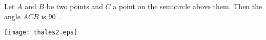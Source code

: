 \documentclass[12pt]{article}
\begin{document}
Let $A$ and $B$ be two points and $C$ a point on the semicircle above them. Then the angle $ACB$ is $90^\circ$.
\begin{center}
\texttt{[image: thales2.eps]}
\end{center}
\end{document}

